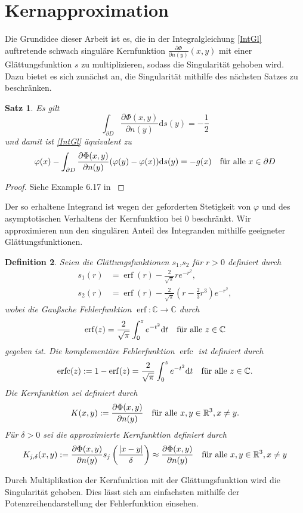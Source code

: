 \documentclass[12pt,a4paper]{scrartcl}
\newtheorem{Satz}{Satz}[section]
\newtheorem{Def}[Satz]{Definition}
\newcommand{\dd}{\mathrm{d}}
\numberwithin{equation}{section}
\newcommand{\C}{\mathbb{C}} %
\newcommand{\R}{\mathbb{R}} %
\newcommand{\erf}{\operatorname{erf}}
\newcommand{\erfc}{\operatorname{erfc}}
\newcommand{\fa}{\text{\quad für alle }}
\begin{document}
\section{Kernapproximation} \label{chaKernapprox}
Die Grundidee dieser Arbeit ist es, die in der Integralgleichung \eqref{IntGl} auftretende schwach singuläre Kernfunktion $\frac{\partial \Phi}{\partial n (y)}(x,y)$ mit einer Glättungsfunktion $s$ zu multiplizieren, sodass die Singularität gehoben wird. Dazu bietet es sich zunächst an, die Singularität mithilfe des nächsten Satzes zu beschränken.
\begin{Satz} \label{MinSing}
Es gilt
\begin{equation}
\int_{\partial D} \frac{\partial \Phi(x,y)}{\partial n (y)} \dd s(y) = - \frac{1}{2}
\end{equation}
und damit ist \eqref{IntGl} äquivalent zu 
\begin{equation} \label{IntGl2}
\varphi(x) - \int_{\partial D} \frac{\partial \Phi(x,y)}{\partial n (y)}(\varphi(y)-\varphi(x)) \dd s(y) = - g(x) \fa x \in \partial D
\end{equation} 
\end{Satz}
\begin{proof}
Siehe Example 6.17 in \cite{kress}
\end{proof}
Der so erhaltene Integrand ist wegen der geforderten Stetigkeit von $\varphi$ und des asymptotischen Verhaltens der Kernfunktion bei $0$ beschränkt. Wir approximieren nun den singulären Anteil des Integranden mithilfe geeigneter Glättungsfunktionen.
\begin{Def}
Seien die \emph{Glättungsfunktionen} $s_1$,$s_2$ für $r>0$ definiert durch
\begin{align*}
s_1(r) &= \erf(r) -\frac{2}{\sqrt{\pi}}r e^{-r^2}, \\
s_2(r) &= \erf(r) -\frac{2}{\sqrt{\pi}}\left(r- \frac{2}{3}r^3\right) e^{-r^2},
\end{align*}
wobei die \emph{Gaußsche Fehlerfunktion} $\erf: \C \to \C$ durch 
\[
\erf(z) = \frac{2}{\sqrt{\pi}}\int_0^z e^{-t^2} \dd t \fa z\in\C
\]
gegeben ist. Die \emph{komplementäre Fehlerfunktion} $\erfc$ ist definiert durch 
\[
\erfc(z) := 1 - \erf(z) = \frac{2}{\sqrt{\pi}}\int_0^z e^{-t^2} \dd t \fa z\in\C.
\]
 Die \emph{Kernfunktion} sei definiert durch 
\[
K(x,y) :=\frac{\partial \Phi(x,y)}{\partial n (y)} \fa x,y\in \R^3,x\neq y.
\]
Für $\delta>0$ sei die \emph{approximierte Kernfunktion} definiert durch
\begin{equation} \label{defKd}
K_{j,\delta}(x,y) := \frac{\partial \Phi(x,y)}{\partial n (y)} s_j \left(\frac{|x-y|}{\delta}\right) \approx \frac{\partial \Phi(x,y)}{\partial n (y)} \fa x,y \in \R^3,x \neq y
\end{equation}
\end{Def}
Durch Multiplikation der Kernfunktion mit der Glättungsfunktion wird die Singularität gehoben. Dies lässt sich am einfachsten mithilfe der Potenzreihendarstellung der Fehlerfunktion einsehen.
\end{document}
